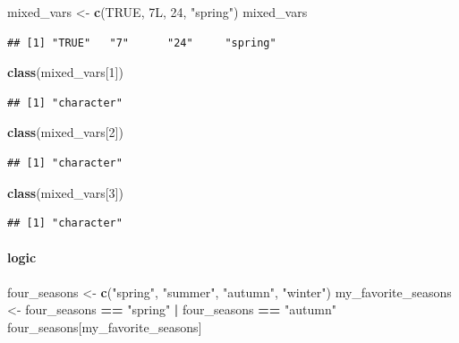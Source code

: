 \documentclass[
]{book}
\newenvironment{Shaded}{\begin{snugshade}}{\end{snugshade}}
\newcommand{\ConstantTok}[1]{\textcolor[rgb]{0.56,0.35,0.01}{#1}}
\newcommand{\DataTypeTok}[1]{\textcolor[rgb]{0.13,0.29,0.53}{#1}}
\newcommand{\DecValTok}[1]{\textcolor[rgb]{0.00,0.00,0.81}{#1}}
\newcommand{\FunctionTok}[1]{\textcolor[rgb]{0.13,0.29,0.53}{\textbf{#1}}}
\newcommand{\NormalTok}[1]{#1}
\newcommand{\OtherTok}[1]{\textcolor[rgb]{0.56,0.35,0.01}{#1}}
\newcommand{\SpecialCharTok}[1]{\textcolor[rgb]{0.81,0.36,0.00}{\textbf{#1}}}
\newcommand{\StringTok}[1]{\textcolor[rgb]{0.31,0.60,0.02}{#1}}
\theoremstyle{definition}
\theoremstyle{definition}
\theoremstyle{definition}
\theoremstyle{definition}
\theoremstyle{remark}
\begin{document}
\begin{Shaded}
\begin{Highlighting}[]
\NormalTok{mixed\_vars }\OtherTok{\textless{}{-}} \FunctionTok{c}\NormalTok{(}\ConstantTok{TRUE}\NormalTok{, }\DecValTok{7}\DataTypeTok{L}\NormalTok{, }\DecValTok{24}\NormalTok{, }\StringTok{"spring"}\NormalTok{)}
\NormalTok{mixed\_vars}
\end{Highlighting}
\end{Shaded}

\begin{verbatim}
## [1] "TRUE"   "7"      "24"     "spring"
\end{verbatim}

\begin{Shaded}
\begin{Highlighting}[]
\FunctionTok{class}\NormalTok{(mixed\_vars[}\DecValTok{1}\NormalTok{])}
\end{Highlighting}
\end{Shaded}

\begin{verbatim}
## [1] "character"
\end{verbatim}

\begin{Shaded}
\begin{Highlighting}[]
\FunctionTok{class}\NormalTok{(mixed\_vars[}\DecValTok{2}\NormalTok{])}
\end{Highlighting}
\end{Shaded}

\begin{verbatim}
## [1] "character"
\end{verbatim}

\begin{Shaded}
\begin{Highlighting}[]
\FunctionTok{class}\NormalTok{(mixed\_vars[}\DecValTok{3}\NormalTok{])}
\end{Highlighting}
\end{Shaded}

\begin{verbatim}
## [1] "character"
\end{verbatim}

\paragraph{logic}\label{logic}

\begin{Shaded}
\begin{Highlighting}[]
\NormalTok{four\_seasons }\OtherTok{\textless{}{-}} \FunctionTok{c}\NormalTok{(}\StringTok{"spring"}\NormalTok{, }\StringTok{"summer"}\NormalTok{, }\StringTok{"autumn"}\NormalTok{, }\StringTok{"winter"}\NormalTok{)}
\NormalTok{my\_favorite\_seasons }\OtherTok{\textless{}{-}}\NormalTok{ four\_seasons }\SpecialCharTok{==} \StringTok{"spring"} \SpecialCharTok{|}\NormalTok{ four\_seasons }\SpecialCharTok{==} \StringTok{"autumn"}
\NormalTok{four\_seasons[my\_favorite\_seasons]}
\end{Highlighting}
\end{Shaded}
\end{document}
